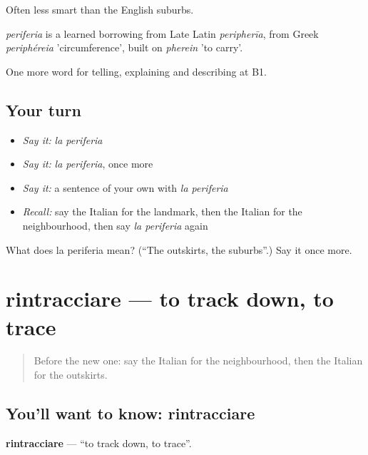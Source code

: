 Often less smart than the English suburbs.

\begin{cousinweb}
\emph{periferia} is a learned borrowing from Late Latin \emph{peripherīa}, from Greek \emph{periphéreia} 'circumference', built on \emph{pherein} 'to carry'.
\end{cousinweb}

\begin{grammarlens}[title={What you've built}]
One more word for telling, explaining and describing at B1.
\end{grammarlens}

\subsection*{Your turn}
\begin{itemize}
\raggedright
  \item \emph{Say it:} \emph{la periferia}
  \item \emph{Say it:} \emph{la periferia}, once more
  \item \emph{Say it:} a sentence of your own with \emph{la periferia}
  \item \emph{Recall:} say the Italian for the landmark, then the Italian for the neighbourhood, then say \emph{la periferia} again
\end{itemize}

\begin{tcolorbox}[breakable,colback=teal!4,colframe=teal!35!black,title={Before you move on}]
What does la periferia mean? (\textquotedblleft{}The outskirts, the suburbs\textquotedblright{}.) Say it once more.
\end{tcolorbox}
\section[rintracciare]{rintracciare — to track down, to trace}

\label{lesson:IT-C444-rintracciare}



\begin{quote}
Before the new one: say the Italian for the neighbourhood, then the Italian for the outskirts.
\end{quote}

\subsection*{You'll want to know: rintracciare}
\textbf{rintracciare} — \textquotedblleft{}to track down, to trace\textquotedblright{}.

